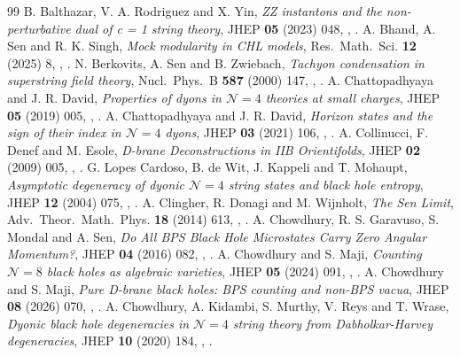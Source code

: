 \begin{thebibliography}{99}
 B. Balthazar, V. A. Rodriguez and X. Yin, \emph{ZZ instantons and the non-perturbative dual of c = 1 string theory}, JHEP \textbf{05} (2023) 048, , .
 A. Bhand, A. Sen and R. K. Singh, \emph{Mock modularity in CHL models}, Res.\ Math.\ Sci. \textbf{12} (2025) 8, , .
 N. Berkovits, A. Sen and B. Zwiebach, \emph{Tachyon condensation in superstring field theory}, Nucl.\ Phys.\ B \textbf{587} (2000) 147, , .
 A. Chattopadhyaya and J. R. David, \emph{Properties of dyons in $\mathcal N=4$ theories at small charges}, JHEP \textbf{05} (2019) 005, , .
 A. Chattopadhyaya and J. R. David, \emph{Horizon states and the sign of their index in $\mathcal N=4$ dyons}, JHEP \textbf{03} (2021) 106, , .
 A. Collinucci, F. Denef and M. Esole, \emph{D-brane Deconstructions in IIB Orientifolds}, JHEP \textbf{02} (2009) 005, , .
 G. Lopes Cardoso, B. de Wit, J. Kappeli and T. Mohaupt, \emph{Asymptotic degeneracy of dyonic $\mathcal N=4$ string states and black hole entropy}, JHEP \textbf{12} (2004) 075, , .
 A. Clingher, R. Donagi and M. Wijnholt, \emph{The Sen Limit}, Adv.\ Theor.\ Math.\ Phys. \textbf{18} (2014) 613, , .
 A. Chowdhury, R. S. Garavuso, S. Mondal and A. Sen, \emph{Do All BPS Black Hole Microstates Carry Zero Angular Momentum?}, JHEP \textbf{04} (2016) 082, , .
 A. Chowdhury and S. Maji, \emph{Counting $\mathcal N=8$ black holes as algebraic varieties}, JHEP \textbf{05} (2024) 091, , .
 A. Chowdhury and S. Maji, \emph{Pure D-brane black holes: BPS counting and non-BPS vacua}, JHEP \textbf{08} (2026) 070, , .
 A. Chowdhury, A. Kidambi, S. Murthy, V. Reys and T. Wrase, \emph{Dyonic black hole degeneracies in $\mathcal N=4$ string theory from Dabholkar-Harvey degeneracies}, JHEP \textbf{10} (2020) 184, , .

\end{thebibliography}

